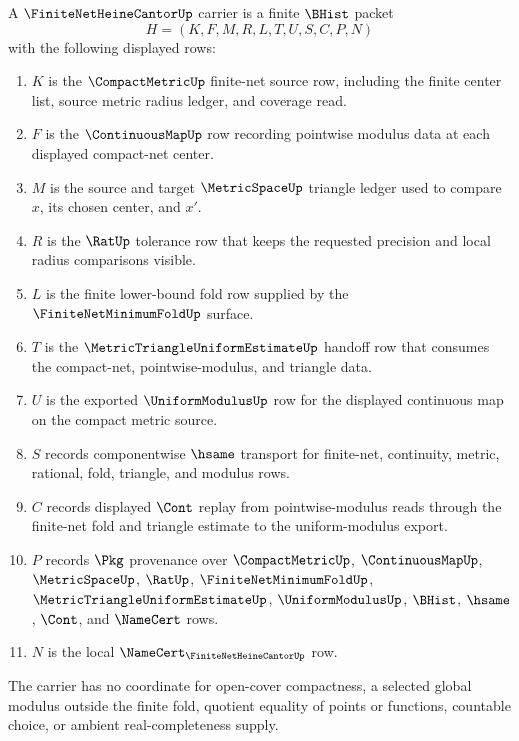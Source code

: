 \begin{definition}
\label{def:finite-net-heine-cantor-carrier}
A $\FiniteNetHeineCantorUp$ carrier is a finite $\BHist$ packet
$$
H=(K,F,M,R,L,T,U,S,C,P,N)
$$
with the following displayed rows:
\begin{enumerate}
\item $K$ is the $\CompactMetricUp$ finite-net source row, including the finite center list, source metric radius ledger, and coverage read.
\item $F$ is the $\ContinuousMapUp$ row recording pointwise modulus data at each displayed compact-net center.
\item $M$ is the source and target $\MetricSpaceUp$ triangle ledger used to compare $x$, its chosen center, and $x'$.
\item $R$ is the $\RatUp$ tolerance row that keeps the requested precision and local radius comparisons visible.
\item $L$ is the finite lower-bound fold row supplied by the $\FiniteNetMinimumFoldUp$ surface.
\item $T$ is the $\MetricTriangleUniformEstimateUp$ handoff row that consumes the compact-net, pointwise-modulus, and triangle data.
\item $U$ is the exported $\UniformModulusUp$ row for the displayed continuous map on the compact metric source.
\item $S$ records componentwise $\hsame$ transport for finite-net, continuity, metric, rational, fold, triangle, and modulus rows.
\item $C$ records displayed $\Cont$ replay from pointwise-modulus reads through the finite-net fold and triangle estimate to the uniform-modulus export.
\item $P$ records $\Pkg$ provenance over $\CompactMetricUp$, $\ContinuousMapUp$, $\MetricSpaceUp$, $\RatUp$, $\FiniteNetMinimumFoldUp$, $\MetricTriangleUniformEstimateUp$, $\UniformModulusUp$, $\BHist$, $\hsame$, $\Cont$, and $\NameCert$ rows.
\item $N$ is the local $\NameCert_{\FiniteNetHeineCantorUp}$ row.
\end{enumerate}
The carrier has no coordinate for open-cover compactness, a selected global modulus outside the finite fold, quotient equality of points or functions, countable choice, or ambient real-completeness supply.
\end{definition}

